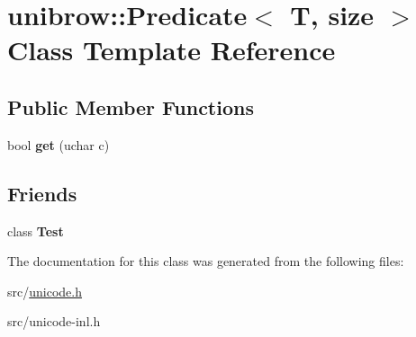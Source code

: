 \hypertarget{classunibrow_1_1_predicate}{}\section{unibrow\+:\+:Predicate$<$ T, size $>$ Class Template Reference}
\label{classunibrow_1_1_predicate}
\subsection*{Public Member Functions}
\begin{DoxyCompactItemize}
\item 
\hypertarget{classunibrow_1_1_predicate_a64022f831257cbfd9ef81898a30ac6fe}{}bool {\bfseries get} (uchar c)\label{classunibrow_1_1_predicate_a64022f831257cbfd9ef81898a30ac6fe}

\end{DoxyCompactItemize}
\subsection*{Friends}
\begin{DoxyCompactItemize}
\item 
\hypertarget{classunibrow_1_1_predicate_a5b78b1c2e1fa07ffed92da365593eaa4}{}class {\bfseries Test}\label{classunibrow_1_1_predicate_a5b78b1c2e1fa07ffed92da365593eaa4}

\end{DoxyCompactItemize}


The documentation for this class was generated from the following files\+:\begin{DoxyCompactItemize}
\item 
src/\hyperlink{unicode_8h}{unicode.\+h}\item 
src/unicode-\/inl.\+h\end{DoxyCompactItemize}
